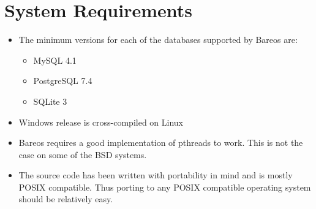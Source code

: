 
\chapter{System Requirements}
\label{SysReqs}

\begin{itemize}
\item The minimum versions for each of the databases supported by Bareos
   are:
   \begin{itemize}
   \item MySQL 4.1
   \item PostgreSQL 7.4
   \item SQLite 3
   \end{itemize}
\item Windows release is cross-compiled on Linux
\item Bareos requires a good implementation of pthreads to work.  This
   is not the case on some of the BSD systems.
\item The source code has been written with portability in mind and is  mostly
   POSIX compatible. Thus porting to any POSIX compatible  operating system
   should be relatively easy.
\end{itemize}
